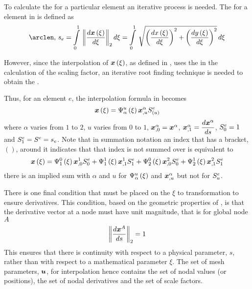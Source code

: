 To calculate the \arclen for a particular element an iterative process is
needed. The \arclen for a \onedal element in \twods is defined as
\begin{equation}
  \text{\arclen, }s_{e}=\gint{0}{1}{\norm{\dby{\fnof{\vect{x}}{\xi}}{\xi}}}
  {\xi}=\gint{0}{1}{\sqrt{\pbrac{\dby{\fnof{x}{\xi}}{\xi}}^{2}+
      \pbrac{\dby{\fnof{y}{\xi}}{\xi}}^{2}}}{\xi}
  \label{eqn:arclendef}
\end{equation}

However, since the interpolation of $\fnof{\vect{x}}{\xi}$, as defined in
, uses the \arclen in the calculation of the
scaling factor, an iterative root finding technique is needed to obtain the
\arclen.

Thus, for an element $e$, the \onedal \cubicherm interpolation
formula in  becomes
\begin{equation}
  \fnof{\vect{x}}{\xi}=\chbfn{\alpha}{u}{\xi}\nodept{\vect{x}}{\alpha}_{,u}
  \esftwo{e}{\pbrac{u}}
  \label{eqn:chsfinterpolation}
\end{equation}
where $\alpha$ varies from $1$ to $2$, $u$ varies from $0$ to $1$,
$\nodept{\vect{x}}{\alpha}_{,0}=\nodept{\vect{x}}{\alpha}$,
$\nodept{\vect{x}}{\alpha}_{,1}= \dby{\nodept{\vect{x}}{\alpha}}{s}$,
$ S^{e}_{0} =1$ and $ S^{e}_{1} = S^{e} =s_{e}$. Note that in summation
notation an index that has a bracket, $()$, around it indicates that that
index is not summed over \eg {} is equivalent to
\begin{equation}
  \fnof{\vect{x}}{\xi}=\chbfn{1}{0}{\xi}\nodept{\vect{x}}{1}_{,0}\esftwo{e}{0}
  +\chbfn{1}{1}{\xi}\nodept{\vect{x}}{1}_{,1}\esftwo{e}{1}+
  \chbfn{2}{0}{\xi}\nodept{\vect{x}}{2}_{,0}\esftwo{e}{0}
  +\chbfn{2}{1}{\xi}\nodept{\vect{x}}{2}_{,1}\esftwo{e}{1}
\end{equation}
\ie there is an implied sum with $\alpha$ and $u$ for $   \Psi_{\alpha}^{u} \left( \xi \right)  $
and $\nodept{\vect{x}}{\alpha}_{,u}$ but not for $ S^{e}_{u} $.

There is one final condition that must be placed on the $\xi$ to \arclen
transformation to ensure \arclen derivatives. This condition, based on the
geometric properties of \arclens, is that the \arclen derivative vector at a
node must have unit magnitude, that is for global node $A$
\begin{equation}
  \norm{\dby{\nodept{\vect{x}}{A}}{s}}=1
  \label{eqn:chnormconstraint}
\end{equation}
This ensures that there is continuity with respect to a physical parameter,
$s$, rather than with respect to a mathematical parameter $\xi$. The set of
mesh parameters, $\vect{u}$, for \cubicherm interpolation hence contains the
set of nodal values (or positions), the set of nodal \arclen derivatives and
the set of scale factors.

